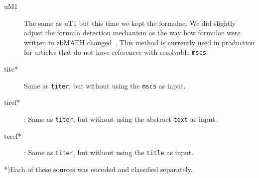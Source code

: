 \begin{description}
  \item[uM1] The same as uT1 but this time we kept the formulae. We did slightly adjust the formula detection mechanism as the way how formulae were written in zbMATH changed~\cite{Schubotz2019b}.
  This method is currently used in production for articles that do not have references with resolvable \texttt{mscs}.
  \item[tite*] Same as \texttt{titer}, but without using the \texttt{mscs} as input.
  \item[tiref*]: Same as \texttt{titer}, but without using the abstract \texttt{text} as input.
  \item[teref*]: Same as \texttt{titer}, but without using the \texttt{title} as input.
\end{description}

*)Each of these sources was encoded and classified separately.
